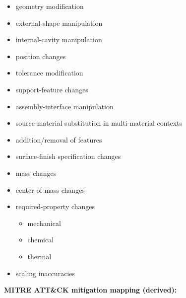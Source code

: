 \documentclass[10pt,a4paper,oneside]{report}
\begin{document}
\begin{itemize}
\item geometry modification
\item external-shape manipulation
\item internal-cavity manipulation
\item position changes
\item tolerance modification
\item support-feature changes
\item assembly-interface manipulation
\item source-material substitution in multi-material contexts
\item addition/removal of features
\item surface-finish specification changes
\item mass changes
\item center-of-mass changes
\item required-property changes
\begin{itemize}
\item mechanical
\item chemical
\item thermal
\end{itemize}
\item scaling inaccuracies
\end{itemize}

\textbf{MITRE ATT\&CK mitigation mapping (derived):}
\end{document}
